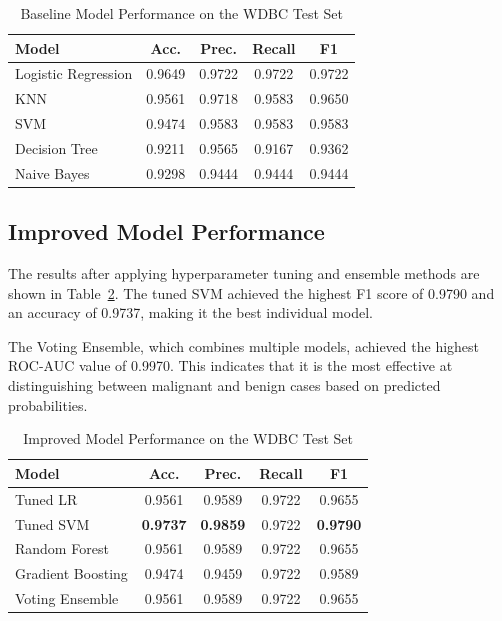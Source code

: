 \documentclass[conference]{IEEEtran}
\begin{document}
\begin{table}[H]
\centering
\caption{Baseline Model Performance on the WDBC Test Set}
\label{tab:baseline}
\begin{tabular}{lcccc}
\toprule
\textbf{Model} & \textbf{Acc.} & \textbf{Prec.} &
\textbf{Recall} & \textbf{F1} \\
\midrule
Logistic Regression & 0.9649 & 0.9722 & 0.9722 & 0.9722 \\
KNN                 & 0.9561 & 0.9718 & 0.9583 & 0.9650 \\
SVM                 & 0.9474 & 0.9583 & 0.9583 & 0.9583 \\
Decision Tree       & 0.9211 & 0.9565 & 0.9167 & 0.9362 \\
Naive Bayes         & 0.9298 & 0.9444 & 0.9444 & 0.9444 \\
\bottomrule
\end{tabular}
\end{table}

\subsection{Improved Model Performance}

The results after applying hyperparameter tuning and ensemble methods are shown in Table~\ref{tab:improved}. The tuned SVM achieved the highest F1 score of 0.9790 and an accuracy of 0.9737, making it the best individual model.

The Voting Ensemble, which combines multiple models, achieved the highest ROC-AUC value of 0.9970. This indicates that it is the most effective at distinguishing between malignant and benign cases based on predicted probabilities.

\begin{table}[H]
\centering
\caption{Improved Model Performance on the WDBC Test Set}
\label{tab:improved}
\begin{tabular}{lcccc}
\toprule
\textbf{Model} & \textbf{Acc.} & \textbf{Prec.} &
\textbf{Recall} & \textbf{F1} \\
\midrule
Tuned LR            & 0.9561 & 0.9589 & 0.9722 & 0.9655 \\
Tuned SVM           & \textbf{0.9737} & \textbf{0.9859} & 0.9722 & \textbf{0.9790} \\
Random Forest       & 0.9561 & 0.9589 & 0.9722 & 0.9655 \\
Gradient Boosting   & 0.9474 & 0.9459 & 0.9722 & 0.9589 \\
Voting Ensemble     & 0.9561 & 0.9589 & 0.9722 & 0.9655 \\
\bottomrule
\end{tabular}
\end{table}
\end{document}
